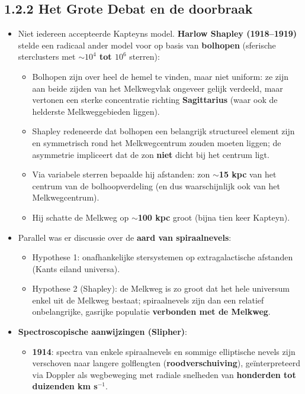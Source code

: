 \documentclass[10pt,a4paper]{article}
\begin{document}
\subsection*{1.2.2 Het Grote Debat en de doorbraak}
\begin{itemize}
  \item Niet iedereen accepteerde Kapteyns model. \textbf{Harlow Shapley (1918--1919)} stelde een radicaal ander model voor op basis van \textbf{bolhopen} (sferische sterclusters met $\sim$\textbf{$10^4$ tot $10^6$} sterren):
  \begin{itemize}
    \item Bolhopen zijn over heel de hemel te vinden, maar niet uniform: ze zijn aan beide zijden van het Melkwegvlak ongeveer gelijk verdeeld, maar vertonen een sterke concentratie richting \textbf{Sagittarius} (waar ook de helderste Melkweggebieden liggen).
    \item Shapley redeneerde dat bolhopen een belangrijk structureel element zijn en symmetrisch rond het Melkwegcentrum zouden moeten liggen; de asymmetrie impliceert dat de zon \textbf{niet} dicht bij het centrum ligt.
    \item Via variabele sterren bepaalde hij afstanden: zon $\sim$\textbf{15 kpc} van het centrum van de bolhoopverdeling (en dus waarschijnlijk ook van het Melkwegcentrum).
    \item Hij schatte de Melkweg op $\sim$\textbf{100 kpc} groot (bijna tien keer Kapteyn).
  \end{itemize}
  \item Parallel was er discussie over de \textbf{aard van spiraalnevels}:
  \begin{itemize}
    \item Hypothese 1: onafhankelijke stersystemen op extragalactische afstanden (Kants eiland universa).
    \item Hypothese 2 (Shapley): de Melkweg is zo groot dat het hele universum enkel uit de Melkweg bestaat; spiraalnevels zijn dan een relatief onbelangrijke, gasrijke populatie \textbf{verbonden met de Melkweg}.
  \end{itemize}
  \item \textbf{Spectroscopische aanwijzingen (Slipher)}:
  \begin{itemize}
    \item \textbf{1914}: spectra van enkele spiraalnevels en sommige elliptische nevels zijn verschoven naar langere golflengten (\textbf{roodverschuiving}), geïnterpreteerd via Doppler als wegbeweging met radiale snelheden van \textbf{honderden tot duizenden km s$^{-1}$}.

\end{itemize}
\end{itemize}
\end{document}
